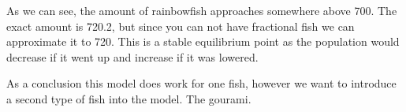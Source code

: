 \begin{flushleft}
    As we can see, the amount of rainbowfish approaches somewhere
    above 700.
    The exact amount is 720.2, but since you can not have
    fractional fish we can approximate it to 720. This is
    a stable equilibrium point as the population would decrease if it went up and increase if it was lowered.
\end{flushleft}

\begin{flushleft}
    As a conclusion this model does work for one fish,
    however we want to introduce a second type of fish
    into the model. The gourami.
\end{flushleft}